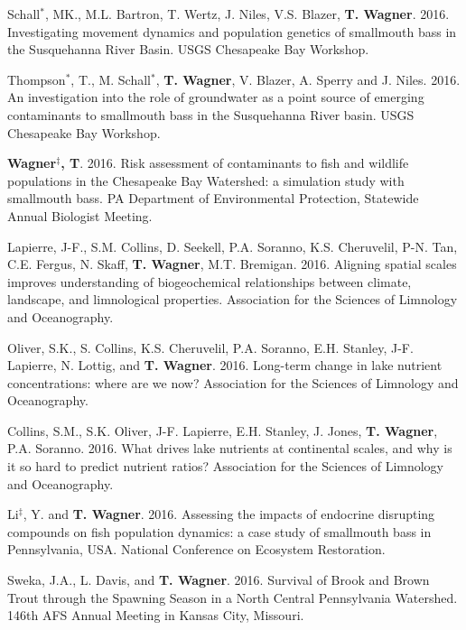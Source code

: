 \documentclass[10pt]{article}
\begin{document}
\begin{flushleft}
\begin{etaremune}
\item Schall$^*$, MK., M.L. Bartron, T. Wertz, J. Niles, V.S. Blazer, {\bf T. Wagner}. 2016. Investigating movement dynamics and population genetics of smallmouth bass in the Susquehanna River Basin. USGS Chesapeake Bay Workshop.

Thompson$^*$, T., M. Schall$^*$, {\bf T. Wagner}, V. Blazer, A. Sperry and J. Niles. 2016. An investigation into the role of groundwater as a point source of emerging contaminants to smallmouth bass in the Susquehanna River basin. USGS Chesapeake Bay Workshop.

 \item {\bf Wagner$^\ddagger$, T}. 2016. Risk assessment of contaminants to fish and wildlife populations in the Chesapeake Bay Watershed: a simulation study with smallmouth bass. PA Department of Environmental Protection, Statewide Annual Biologist Meeting.

\item Lapierre, J-F., S.M. Collins, D. Seekell, P.A. Soranno, K.S. Cheruvelil, P-N. Tan, C.E. Fergus, N. Skaff,  {\bf T. Wagner}, M.T. Bremigan. 2016. Aligning spatial scales improves understanding of biogeochemical relationships between climate, landscape, and limnological properties. Association for the Sciences of Limnology and Oceanography.

\item Oliver, S.K., S. Collins, K.S. Cheruvelil, P.A. Soranno, E.H. Stanley, J-F. Lapierre, N. Lottig, and  {\bf T. Wagner}. 2016. Long-term change in lake nutrient concentrations: where are we now? Association for the Sciences of Limnology and Oceanography. 

\item Collins, S.M., S.K. Oliver, J-F. Lapierre, E.H. Stanley, J. Jones,  {\bf T. Wagner}, P.A. Soranno. 2016. What drives lake nutrients at continental scales, and why is it so hard to predict nutrient ratios? Association for the Sciences of Limnology and Oceanography. 

\item Li$^\ddagger$, Y. and  {\bf T. Wagner}. 2016. Assessing the impacts of endocrine disrupting compounds on fish population dynamics: a case study of smallmouth bass in Pennsylvania, USA. National Conference on Ecosystem Restoration. 

\item Sweka, J.A., L. Davis, and {\bf T. Wagner}. 2016. Survival of Brook and Brown Trout through the Spawning Season in a North Central Pennsylvania Watershed. 146th AFS Annual Meeting in Kansas City, Missouri.


\end{etaremune}
\end{flushleft}
\end{document}
